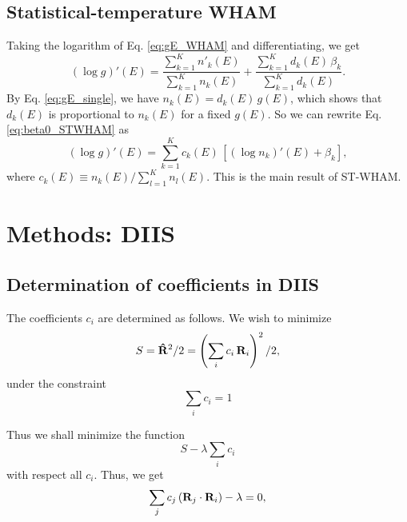 \documentclass[aip,jcp,preprint,notitlepage, superscriptaddress]{revtex4-1}
\begin{document}
\subsection{Statistical-temperature WHAM}



Taking the logarithm of Eq. \eqref{eq:gE_WHAM} and differentiating,
we get
\begin{equation}
(\log g)'(E)
=
\frac{ \sum_{k = 1}^K n'_k(E) }
     { \sum_{k = 1}^K n_k(E) }
+
\frac{ \sum_{k = 1}^K d_k(E) \, \beta_k }
     { \sum_{k = 1}^K d_k(E) }.
\label{eq:beta0_STWHAM}
\end{equation}
%
By Eq. \eqref{eq:gE_single},
we have
$n_k(E) = d_k(E) \, g(E)$,
which shows that
$d_k(E)$
is proportional to $n_k(E)$
for a fixed $g(E)$.
%
So we can rewrite Eq. \eqref{eq:beta0_STWHAM} as
%
\begin{equation}
(\log g)'(E)
=
\sum_{k = 1}^K c_k(E) \, \left[ (\log n_k)'(E)  + \beta_k \right],
\label{eq:beta_STWHAM}
\end{equation}
%
where
$c_k(E) \equiv n_k(E) / \sum_{l = 1}^{K} n_l(E)$.
%
This is the main result of ST-WHAM.





\section{Methods: DIIS}


\subsection{Determination of coefficients in DIIS}



The coefficients $c_i$ are determined as follows.
%
We wish to minimize
%
\[
S
=
\mathbf{\hat R}^2 / 2
=
\left( \sum_i c_i \, \mathbf{R}_i \right)^2 / 2,
\]
under the constraint
%
\begin{equation}
\sum_i c_i = 1
\label{eq:c_normalize}
\end{equation}



Thus we shall minimize the function
\[
  S - \lambda \sum_i c_i
\]
with respect all $c_i$.
%
Thus, we get
\begin{equation}
  \sum_j c_j \, (\mathbf{R}_j \cdot \mathbf{R}_i) - \lambda = 0,
  \label{eq:cj_DIIS}
\end{equation}
\end{document}
